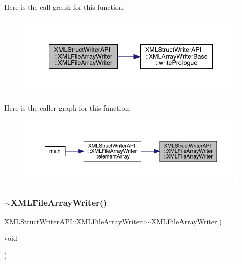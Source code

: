 Here is the call graph for this function\+:
\nopagebreak
\begin{figure}[H]
\begin{center}
\leavevmode
\includegraphics[width=340pt]{d1/d9d/classXMLStructWriterAPI_1_1XMLFileArrayWriter_ab4591c76da7c7db03abe6a3e4cf0529a_cgraph}
\end{center}
\end{figure}
Here is the caller graph for this function\+:
\nopagebreak
\begin{figure}[H]
\begin{center}
\leavevmode
\includegraphics[width=350pt]{d1/d9d/classXMLStructWriterAPI_1_1XMLFileArrayWriter_ab4591c76da7c7db03abe6a3e4cf0529a_icgraph}
\end{center}
\end{figure}
\mbox{\label{classXMLStructWriterAPI_1_1XMLFileArrayWriter_acfdbf7c2c12e6cbed700fb0fc48977e7}} 
\subsubsection{\texorpdfstring{$\sim$XMLFileArrayWriter()}{~XMLFileArrayWriter()}\hspace{0.1cm}{\footnotesize\ttfamily [1/3]}}
{\footnotesize\ttfamily X\+M\+L\+Struct\+Writer\+A\+P\+I\+::\+X\+M\+L\+File\+Array\+Writer\+::$\sim$\+X\+M\+L\+File\+Array\+Writer (\begin{DoxyParamCaption}\item[{void}]{ }\end{DoxyParamCaption})\hspace{0.3cm}{\ttfamily [inline]}}

